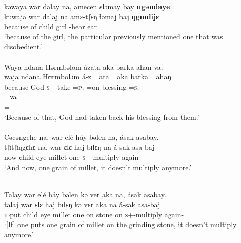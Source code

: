 \medskip
\largerpage[2]
kəwaya  war  dalay  na,  amecen  sləmay  bay \textbf{ngəndəye}. \\   
\gll kuwaja        war    dalaj     na   amɛ-tʃɛŋ      ɬəmaj  baj \textbf{ŋgɪndijɛ}\\
     {because of}  child    girl    {\PSP}  {\DEP}-hear   ear      {\NEG}  {\DEM}\\
\glt ‘because of the girl, the particular previously mentioned one that was disobedient.’\\

\medskip
{}\\
Waya  ndana  Hərmbəlom  ázata  aka  barka  ahan  va.\\
\gll waja     ndana   Hʊrmbʊlɔm   á-z     =ata     =aka  barka     =ahaŋ   \\
      because  {\DEM}   God      \textsc{s}+{\IFV}-take  =\textsc{p}.{\IO}  =on   blessing  =\textsc{s}.{\POSS}  \\
      
\medskip
\gll   =va  \\
={\PRF}\\
\glt ‘Because of that, God had taken back his blessing from them.’\\

\medskip
{}\\
     Cəcəngehe  na,  war  elé  háy  bəlen  na,  ásak  asabay.\\
\gll tʃɪtʃɪŋgɛhɛ  na,  war  ɛlɛ        haj  bɪlɛŋ     na      á-sak                                        asa-baj\\
      now       {\PSP}  child   eye   millet   one   {\PSP}  \textsc{s}+{\IFV}-multiply    again-{\NEG}\\
\glt ‘And now, one grain of millet, it doesn’t multiply anymore.’

\medskip
{}\\
        Talay war elé  háy bəlen kə ver aka na, ásak asabay.\\
\gll    talaj          war     ɛlɛ    haj      bɪlɛŋ  kə     vɛr     aka  na        á-sak                                      asa-baj\\
       \textsc{id}put  child   eye   millet    one    on    stone    on    {\PSP}  \textsc{s}+{\IFV}-multiply  again-{\NEG}\\
\glt ‘[If] one puts one grain of millet on the grinding stone, it doesn’t multiply anymore.’

